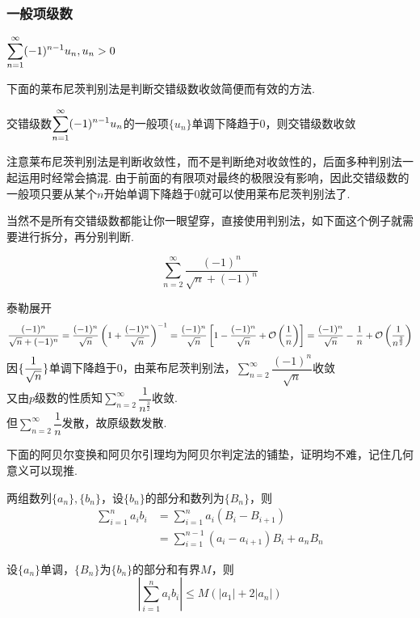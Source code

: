 \subsubsection{一般项级数}
\begin{definition}[交错级数]
$\displaystyle\sum_{n=1}^{\infty}(-1)^{n-1}u_n,u_n>0$
\end{definition}
\par 下面的莱布尼茨判别法是判断交错级数收敛简便而有效的方法.
\begin{theorem}
交错级数$\displaystyle\sum_{n=1}^{\infty}(-1)^{n-1}u_n$的一般项$\{u_n\}$单调下降趋于$0$，则交错级数收敛
\end{theorem}
\par 注意莱布尼茨判别法是判断收敛性，而不是判断绝对收敛性的，后面多种判别法一起运用时经常会搞混. 由于前面的有限项对最终的极限没有影响，因此交错级数的一般项只要从某个$n$开始单调下降趋于$0$就可以使用莱布尼茨判别法了.
\par 当然不是所有交错级数都能让你一眼望穿，直接使用判别法，如下面这个例子就需要进行拆分，再分别判断.
\begin{example}
\[\sum_{n=2}^{\infty}\dfrac{(-1)^n}{\sqrt{n}+(-1)^n}\]
\end{example}
\begin{analysis}泰勒展开
\[\dfrac{(-1)^n}{\sqrt{n}+(-1)^n}=\dfrac{(-1)^n}{\sqrt{n}}\left(1+\dfrac{(-1)^n}{\sqrt{n}}\right)^{-1}
=\dfrac{(-1)^n}{\sqrt{n}}\left[1-\dfrac{(-1)^n}{\sqrt{n}}+\mathcal{O}\left(\dfrac{1}{n}\right)\right]
=\dfrac{(-1)^n}{\sqrt{n}}-\dfrac{1}{n}+\mathcal{O}\left(\dfrac{1}{n^{\frac{3}{2}}}\right)\]
因$\{\dfrac{1}{\sqrt{n}}\}$单调下降趋于$0$，由莱布尼茨判别法，$\displaystyle\sum_{n=2}^{\infty}\dfrac{(-1)^n}{\sqrt{n}}$收敛\\
又由$p$级数的性质知$\displaystyle\sum_{n=2}^{\infty}\dfrac{1}{n^{\frac{3}{2}}}$收敛.\\
但$\displaystyle\sum_{n=2}^\infty\dfrac{1}{n}$发散，故原级数发散.
\end{analysis}
\par 下面的阿贝尔变换和阿贝尔引理均为阿贝尔判定法的铺垫，证明均不难，记住几何意义可以现推.
\begin{theorem}
两组数列$\{a_n\},\{b_n\}$，设$\{b_n\}$的部分和数列为$\{B_n\}$，则
\[\begin{aligned}
\sum_{i=1}^na_ib_i&=\sum_{i=1}^na_i(B_i-B_{i+1})\\
&=\sum_{i=1}^{n-1}(a_i-a_{i+1})B_i+a_nB_n
\end{aligned}\]
\end{theorem}
\begin{theorem}[阿贝尔引理]
设$\{a_n\}$单调，$\{B_n\}$为$\{b_n\}$的部分和有界$M$，则
\[\left|\sum_{i=1}^na_ib_i\right|\leq M(|a_1|+2|a_n|)\]
\end{theorem}


